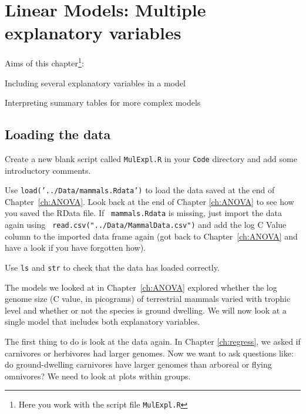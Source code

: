 \chapter{Linear Models: Multiple explanatory variables}
\label{ch:MulExpl}

Aims of this chapter\footnote{Here you work with the script file {\tt MulExpl.R}}:

\begin{compactitem}
	\item Including several explanatory variables in a model
	\item Interpreting summary tables for more complex models
\end{compactitem}

\section{Loading the data}

\begin{compactitem}[$\quad\star$]
	\item Create a new blank script called {\tt MulExpl.R} in your 
	{\tt Code} directory and add some introductory comments.

	\item Use {\tt load('../Data/mammals.Rdata')} to load the data saved 
	at the end of Chapter~\ref{ch:ANOVA}. Look back at the end of Chapter 
	\ref{ch:ANOVA} to see how you saved the RData file. If {\tt 
	mammals.Rdata} is missing, just import the data again using {\tt 
	read.csv("../Data/MammalData.csv")} and add the log C Value column to 
	the imported data frame again (got back to Chapter~\ref{ch:ANOVA} and 
	have a look if you have forgotten how).

	\item Use {\tt ls} and {\tt str} to check that the data has loaded 
	correctly.
	
\end{compactitem}

The models we looked at in Chapter~\ref{ch:ANOVA} explored whether 
the log genome size (C value, in picograms) of terrestrial mammals 
varied with trophic level and  whether or not the species is ground 
dwelling. We will now look at a single model that includes both 
explanatory variables. 

The first thing to do is look at the data again. In Chapter 
\ref{ch:regress}, we asked if carnivores or herbivores had larger 
genomes. Now we want to ask questions like: do ground-dwelling 
carnivores have larger genomes than arboreal or flying omnivores? We 
need to look at plots within groups. 

